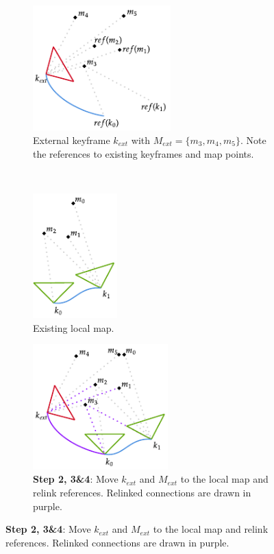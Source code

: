 \begin{figure}[h]
    \centering

    \begin{subfigure}[t]{0.3\textwidth}
        \centering
        \includegraphics[height=1.9in]{figures/external_key_frame_insertion_1.pdf}
        \caption{External keyframe $k_{ext}$ with $M_{ext}=\{m_3, m_4, m_5\}$. Note the references to existing keyframes and map points.}
    \end{subfigure}%
    ~
    \begin{subfigure}[t]{0.3\textwidth}
        \centering
        \includegraphics[height=1.9in]{figures/external_key_frame_insertion_2.pdf}
        \caption{Existing local map.}
    \end{subfigure}%
    \par\bigskip
    \begin{subfigure}[t]{0.333\textwidth}
        \centering
        \includegraphics[height=1.9in]{figures/external_key_frame_insertion_3.pdf}
        \caption{\textbf{Step 2, 3\&4}: Move $k_{ext}$ and $M_{ext}$ to the local map and relink references. Relinked connections are drawn in purple.}

\end{subfigure}
\end{figure}

